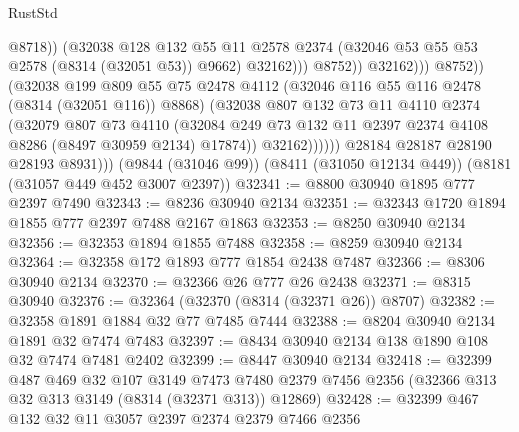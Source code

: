 \begin{lexlean}{RustStd}
\begin{coremodule}
                                        @8718))
                                    (@32038
                                      @128
                                      @132
                                      @55
                                      @11
                                      @2578
                                      @2374
                                      (@32046 @53 @55 @53 @2578 (@8314 (@32051 @53)) @9662)
                                      @32162)))
                                @8752))
                            @32162)))
                      @8752))
                  (@32038
                    @199
                    @809
                    @55
                    @75
                    @2478
                    @4112
                    (@32046 @116 @55 @116 @2478 (@8314 (@32051 @116)) @8868)
                    (@32038
                      @807
                      @132
                      @73
                      @11
                      @4110
                      @2374
                      (@32079
                        @807
                        @73
                        @4110
                        (@32084
                          @249
                          @73
                          @132
                          @11
                          @2397
                          @2374
                          @4108
                          @8286
                          (@8497 @30959 @2134)
                          @17874))
                      @32162))))))
          @28184
          @28187
          @28190
          @28193
          @8931)))
    (@9844 (@31046 @99))
    (@8411 (@31050 @12134 @449))
    (@8181 (@31057 @449 @452 @3007 @2397))
@32341 := @8800 @30940 @1895 @777 @2397 @7490
@32343 := @8236 @30940 @2134
@32351 := @32343 @1720 @1894 @1855 @777 @2397 @7488 @2167 @1863
@32353 := @8250 @30940 @2134
@32356 := @32353 @1894 @1855 @7488
@32358 := @8259 @30940 @2134
@32364 := @32358 @172 @1893 @777 @1854 @2438 @7487
@32366 := @8306 @30940 @2134
@32370 := @32366 @26 @777 @26 @2438
@32371 := @8315 @30940
@32376 := @32364 (@32370 (@8314 (@32371 @26)) @8707)
@32382 := @32358 @1891 @1884 @32 @77 @7485 @7444
@32388 := @8204 @30940 @2134 @1891 @32 @7474 @7483
@32397 := @8434 @30940 @2134 @138 @1890 @108 @32 @7474 @7481 @2402
@32399 := @8447 @30940 @2134
@32418 := @32399
    @487
    @469
    @32
    @107
    @3149
    @7473
    @7480
    @2379
    @7456
    @2356
    (@32366 @313 @32 @313 @3149 (@8314 (@32371 @313)) @12869)
@32428 := @32399 @467 @132 @32 @11 @3057 @2397 @2374 @2379 @7466 @2356

\end{coremodule}
\end{lexlean}
